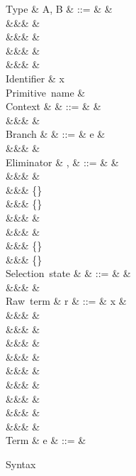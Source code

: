 \begin{figure}
\begin{syntaxfig}
\mbox{Type}
&
A, B
&
::=
&
\tyBool
&
\\
&&&
\tyInt
&
\\
&&&
&
\\
&&&
\tyList{\tyInt}
&
\\
&&&
&
\\[2mm]
\mbox{Identifier}
&
x
\\[2mm]
\mbox{Primitive name}
&
\primOp
\\[2mm]
\mbox{Context}
&
\Gamma
&
::=
&
\cxtEmpty
&
\\
&&&
&
\\[2mm]
\mbox{Branch}
&
\kappa
&
::=
&
e
&
\\
&&&
\sigma
&
\\[2mm]
\mbox{Eliminator}
&
\sigma, \tau
&
::=
&
&
\\
&&&
&
\\
&&&
\{\exTrue \mapsto \kappa\}
\\
&&&
\{\exFalse \mapsto \kappa\}
\\
&&&
\elimProd{\sigma}
&
\\
&&&
\elimList{\branchNil{\kappa}}{\branchCons{\sigma}}
&
\\
&&&
\{\branchNil{\kappa}\}
\\
&&&
\{\branchCons{\sigma}\}
\\[2mm]
\mbox{Selection state}
&
\alpha
&
::=
&
\top
&
\\
&&&
\bot
&
\\[2mm]
\mbox{Raw term}
&
r
&
::=
&
x
&
\\
&&&
\exTrue \mid \exFalse
&
\\
&&&
&
\\
&&&
&
\\
&&&
&
\\
&&&
&
\\
&&&
&
\\
&&&
\exNil
&
\\
&&&
&
\\
&&&
&
\\[2mm]
\mbox{Term}
&
e
&
::=
&
\end{syntaxfig}
\caption{Syntax}
\end{figure}
